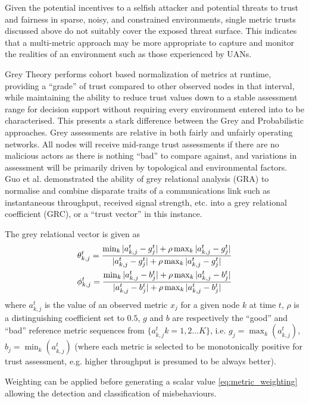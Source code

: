 Given the potential incentives to a selfish attacker and potential threats to trust and fairness in sparse, noisy, and constrained environments, single metric trusts discussed above do not suitably cover the exposed threat surface. 
This indicates that a multi-metric approach may be more appropriate to capture and monitor the realities of an environment such as those experienced by UANs.

Grey Theory performs cohort based normalization of metrics at runtime, providing a ``grade'' of trust compared to other observed nodes in that interval, while maintaining the ability to reduce trust values down to a stable assessment range for decision support without requiring every environment entered into to be characterised.
This presents a stark difference between the Grey and Probabilistic approaches.
Grey assessments are relative in both fairly and unfairly operating networks.
All nodes will receive mid-range trust assessments if there are no malicious actors as there is nothing ``bad'' to compare against, and variations in assessment will be primarily driven by topological and environmental factors.
Guo et al. \cite{Guo11} demonstrated the ability of grey relational analysis (GRA) \cite{Zuo1995} to normalise and combine disparate traits of a communications link such as instantaneous throughput, received signal strength, etc. into a grey relational coefficient (GRC), or a ``trust vector'' in this instance.

The grey relational vector is given as
%
\begin{align}
\label{eq:grc}
\theta_{k,j}^t = \frac{\min_k|a_{k,j}^t - g_j^t| + \rho \max_k|a_{k,j}^t-g_j^t|}{|a_{k,j}^t-g_j^t| + \rho \max_k|a_{k,j}^t-g_j^t|} \\
\phi_{k,j}^t = \frac{\min_k|a_{k,j}^t - b_j^t| + \rho \max_k|a_{k,j}^t-b_j^t|}{|a_{k,j}^t-b_j^t| + \rho \max_k|a_{k,j}^t-b_j^t|} \notag 
\end{align}
%
where $a_{k,j}^t$ is the value of an observed metric $x_j$ for a given node $k$ at time $t$, $\rho$ is a distinguishing coefficient set to $0.5$, $g$ and $b$ are respectively the ``good'' and ``bad'' reference metric sequences from $\{a_{k,j}^t k=1,2\dots K\}$, i.e. $g_j=\max_k({a_{k,j}^t})$,  $b_j=\min_k({a_{k,j}^t})$ (where each metric is selected to be monotonically positive for trust assessment, e.g. higher throughput is presumed to be always better). 

Weighting can be applied before generating a scalar value \eqref{eq:metric_weighting} allowing the detection and classification of misbehaviours.

